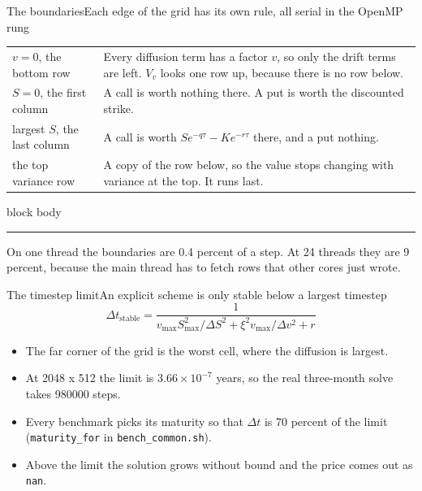 \documentclass[aspectratio=169,11pt]{beamer}
\newcommand{\boundaryShare}{9}
\newcommand{\sigcallout}[1]{%
  \vfill
  \begin{beamercolorbox}[wd=0.74\linewidth,sep=0.55em,rounded=true]{block body}
    \small{\color{sigblue}\rule{0.9ex}{0.9ex}}\hspace{0.5em}#1
  \end{beamercolorbox}%
}
\begin{document}
\begin{frame}{The boundaries}{Each edge of the grid has its own rule, all serial in the OpenMP rung}
  {\small
  \renewcommand{\arraystretch}{1.25}
  \begin{tabularx}{\linewidth}{@{}l X@{}}
    \toprule
    $v = 0$, the bottom row & Every diffusion term has a factor $v$, so only the drift terms are left. $V_v$ looks one row up, because there is no row below. \\
    $S = 0$, the first column & A call is worth nothing there. A put is worth the discounted strike. \\
    largest $S$, the last column & A call is worth $S e^{-q\tau} - K e^{-r\tau}$ there, and a put nothing. \\
    the top variance row & A copy of the row below, so the value stops changing with variance at the top. It runs last. \\
    \bottomrule
  \end{tabularx}}
  \sigcallout{On one thread the boundaries are 0.4 percent of a step. At 24
    threads they are \boundaryShare{} percent, because the main thread has
    to fetch rows that other cores just wrote.}
\end{frame}

\begin{frame}{The timestep limit}{An explicit scheme is only stable below a largest timestep}
  \begin{equation*}
    \Delta t_{\text{stable}} = \frac{1}{v_{\max} S_{\max}^2 / \Delta S^2 + \xi^2 v_{\max} / \Delta v^2 + r}
  \end{equation*}
  {\small
  \begin{itemize}
    \item The far corner of the grid is the worst cell, where the diffusion is largest.
    \item At 2048 x 512 the limit is $3.66 \times 10^{-7}$ years, so the real three-month solve takes 980000 steps.
    \item Every benchmark picks its maturity so that $\Delta t$ is 70 percent of the limit (\texttt{maturity\_for} in \texttt{bench\_common.sh}).
    \item Above the limit the solution grows without bound and the price comes out as \texttt{nan}.
  \end{itemize}}
\end{frame}
\end{document}

